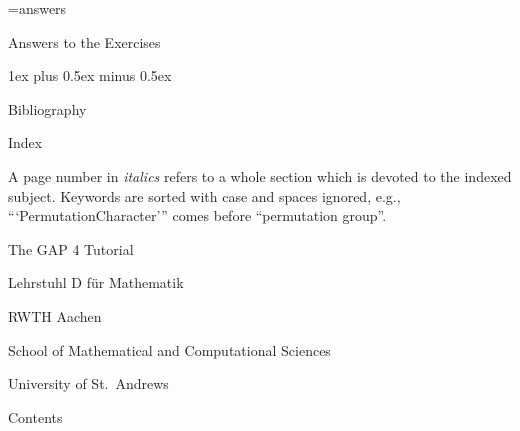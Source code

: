 
\immediate\openout\ans=answers

\FrontMatter
%

\Chapters
{}

\Appendices

\Chapter Answers to the Exercises

\parindent\manindent
\parskip 1ex plus 0.5ex minus 0.5ex
\immediate\closeout\ans


\Chapter Bibliography

\Bibliography

\Chapter Index

A  page number in  {\it italics}  refers  to a  whole section which is
devoted to   the indexed subject.  Keywords are  sorted  with case and
spaces ignored,    e.g.,     ```PermutationCharacter'''  comes  before
``permutation group''.

\Index

\undoquotes
\null\vfill
\centerline{\titlefont The GAP 4 Tutorial}
\bigskip
\centerline{\secfont Lehrstuhl D f\"ur Mathematik}
\smallskip
\centerline{\secfont RWTH Aachen}
\bigskip
\centerline{\secfont School of Mathematical and Computational
Sciences}
\smallskip
\centerline{\secfont University of St.~Andrews}

\Chapter Contents

\medskip

\TableOfContents

\bye
